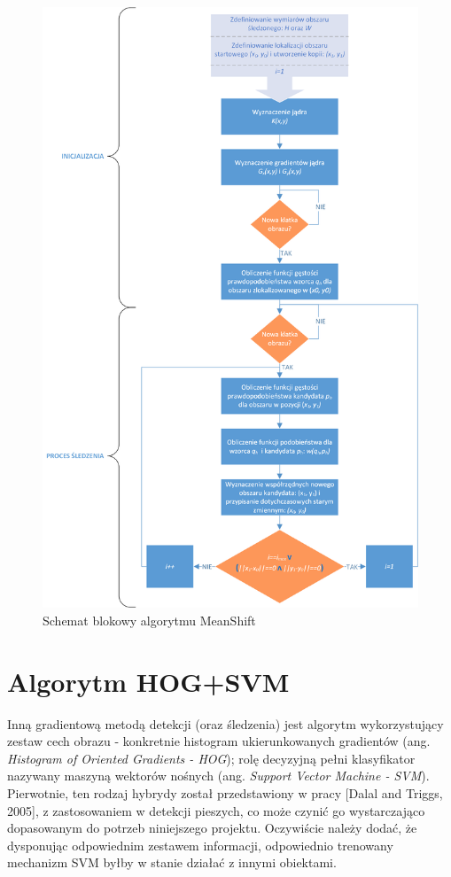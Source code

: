 \begin{figure}
	\centering
	\hspace*{-3cm}
	\includegraphics[width=14.5cm]{3_MS_visio.png}
	\caption{Schemat blokowy algorytmu MeanShift}
	\label{fig:MS_diagram}
\end{figure}

\section{Algorytm HOG+SVM}
\label{sec:HOG&SVM}
Inną gradientową metodą detekcji (oraz śledzenia) jest algorytm wykorzystujący zestaw cech obrazu - konkretnie histogram ukierunkowanych gradientów (ang. \textit{Histogram of Oriented Gradients - HOG}); rolę decyzyjną pełni klasyfikator nazywany maszyną wektorów nośnych (ang. \textit{Support Vector Machine - SVM}). Pierwotnie, ten rodzaj hybrydy został przedstawiony w pracy [Dalal and Triggs, 2005], z zastosowaniem w detekcji pieszych, co może czynić go wystarczająco dopasowanym do potrzeb niniejszego projektu. Oczywiście należy dodać, że dysponując odpowiednim zestawem informacji, odpowiednio trenowany mechanizm SVM byłby w stanie działać z innymi obiektami.

